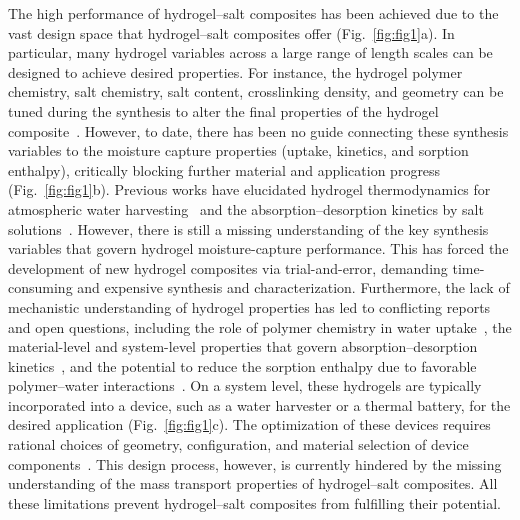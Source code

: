 \documentclass[11pt]{article}
\begin{document}
The high performance of hydrogel--salt composites has been achieved due to the vast design space that hydrogel--salt composites offer (Fig.~\ref{fig:fig1}a). In particular, many hydrogel variables across a large range of length scales can be designed to achieve desired properties. For instance, the hydrogel polymer chemistry, salt chemistry, salt content, crosslinking density, and geometry can be tuned during the synthesis to alter the final properties of the hydrogel composite~\cite{diazmarin2022a,diazmarin2022b,li2018b,kallenberger2018}. However, to date, there has been no guide connecting these synthesis variables to the moisture capture properties (uptake, kinetics, and sorption enthalpy), critically blocking further material and application progress (Fig.~\ref{fig:fig1}b). Previous works have elucidated hydrogel thermodynamics for atmospheric water harvesting~\cite{chen2022} and the absorption--desorption kinetics by salt solutions~\cite{diazmarin2024a}. However, there is still a missing understanding of the key synthesis variables that govern hydrogel moisture-capture performance. This has forced the development of new hydrogel composites via trial-and-error, demanding time-consuming and expensive synthesis and characterization. Furthermore, the lack of mechanistic understanding of hydrogel properties has led to conflicting reports and open questions, including the role of polymer chemistry in water uptake~\cite{graeber2023,lu2022}, the material-level and system-level properties that govern absorption--desorption kinetics~\cite{diazmarin2022a,guo2022,diazmarin2022b,shan2023b}, and the potential to reduce the sorption enthalpy due to favorable polymer--water interactions~\cite{lu2022,wei2023}. On a system level, these hydrogels are typically incorporated into a device, such as a water harvester or a thermal battery, for the desired application (Fig.~\ref{fig:fig1}c). The optimization of these devices requires rational choices of geometry, configuration, and material selection of device components~\cite{li2020,wilson2023,narayanan2014}. This design process, however, is currently hindered by the missing understanding of the mass transport properties of hydrogel--salt composites. All these limitations prevent hydrogel--salt composites from fulfilling their potential.
\end{document}
